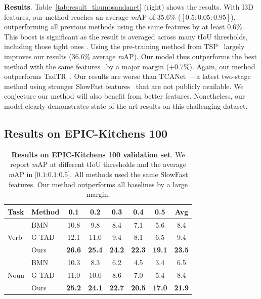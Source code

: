 \smallskip
\noindent \textbf{Results}. Table~\ref{tab:result_thumosandanet} (right) shows the results. With I3D features, our method reaches an average \textit{m}AP of 35.6\% ($[0.5:0.05:0.95]$), outperforming all previous methods using the same features by at least 0.6\%. This boost is significant as the result is averaged across many tIoU thresholds, including those tight ones . Using the pre-training method from TSP~\cite{tspiccvworkshop2021} largely improves our results (36.6\% average \textit{m}AP). Our model thus outperforms the best method with the same features~\cite{vsgniccv2021} by a major margin (+0.7\%). Again, our method outperforms TadTR~\cite{tadtrarxiv2021}. Our results are worse than TCANet~\cite{tcanetcvpr2021}---a latest two-stage method using stronger SlowFast features~\cite{slowfasticcv2019} that are not publicly available. We conjecture our method will also benefit from better features. Nonetheless, our model clearly demonstrates state-of-the-art results on this challenging dataset. 

\subsection{Results on EPIC-Kitchens 100}\label{sec:exp:epic}
\begin{table}[t]
    \centering
    \caption{\textbf{Results on EPIC-Kitchens 100 validation set}. We report \textit{m}AP at different tIoU thresholds and the average \textit{m}AP in $[0.1$:$0.1$:$0.5]$. All methods used the same SlowFast features. Our method outperforms all baselines by a large margin.}
	\label{table:all epic-kitchens results}
    {
    \scriptsize
	\setlength{\tabcolsep}{2.5pt}
	\begin{tabular}{l|l|c|c|c|c|c|c}
	{Task} & {Method} & 0.1 &0.2 & 0.3 & 0.4 & 0.5 & Avg\\
		\hline
	\multirow{3}{*}{Verb} & BMN~\cite{bmniccv2019,epicarxiv2020} & 10.8	&9.8&8.4&7.1&5.6&8.4 \\
	& G-TAD~\cite{gtadcvpr2020} & 12.1 & 11.0 & 9.4 & 8.1 & 6.5 & 9.4\\
	& Ours & \textbf{26.6} & \textbf{25.4} &\textbf{24.2}&\textbf{22.3} &\textbf{19.1} &\textbf{23.5} \\
	\hline 
	\multirow{3}{*}{Noun} & BMN~\cite{bmniccv2019,epicarxiv2020} & 10.3	&8.3&6.2&4.5&3.4&6.5 \\
	& G-TAD~\cite{gtadcvpr2020} & 11.0 & 10.0 & 8.6 & 7.0 & 5.4 & 8.4\\
	& Ours & \textbf{25.2} & \textbf{24.1} &\textbf{22.7}&\textbf{20.5} &\textbf{17.0} &\textbf{21.9} \\
	\end{tabular}}

\end{table}

